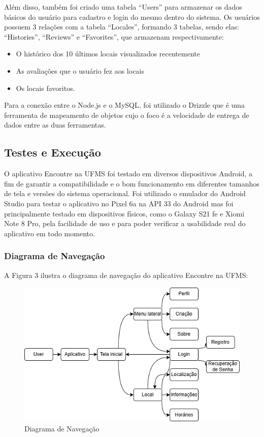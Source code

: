     Além disso, também foi criado uma tabela ``Users'' para armazenar os dados básicos do usuário para cadastro e login do mesmo dentro do sistema. Os usuários possuem 3 relações com a tabela ``Locales'', formando 3 tabelas, sendo elas: ``Histories'', ``Reviews'' e ``Favorites'', que armazenam respectivamente:
    
    \begin{itemize}
        \item O histórico dos 10 últimos locais visualizados recentemente
        \item As avaliações que o usuário fez aos locais 
        \item Os locais favoritos.
    \end{itemize}

    Para a conexão entre o Node.js e o MySQL, foi utilizado o Drizzle que é uma ferramenta de mapeamento de objetos cujo o foco é a velocidade de entrega de dados entre as duas ferramentas. 

\subsection{Testes e Execução}

    O aplicativo Encontre na UFMS foi testado em diversos dispositivos Android, a fim de garantir a compatibilidade e o bom funcionamento em diferentes tamanhos de tela e versões do sistema operacional. Foi utilizado o emulador do Android Studio para testar o aplicativo no Pixel 6a na API 33 do Android mas foi principalmente testado em dispositivos físicos, como o Galaxy S21 fe e Xiomi Note 8 Pro, pela facilidade de uso e para poder verificar a usabilidade real do aplicativo em todo momento.

\subsubsection{Diagrama de Navegação}

    A Figura 3 ilustra o diagrama de navegação do aplicativo Encontre na UFMS:

    \begin{figure}[h]
        \centering
        \includegraphics[width=120mm,height=70mm]{imagens/navegacao.png}
        \caption{\scriptsize Diagrama de Navegação}
        \footnotesize  {}
        \label{fig:diagrama-navegacao}
    \end{figure}

